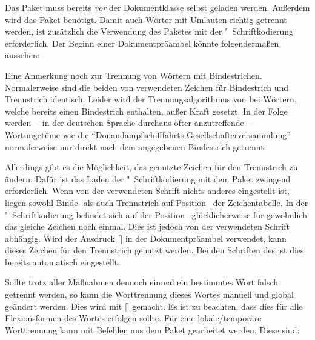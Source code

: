 Das Paket  muss bereits \emph{vor} der Dokumentklasse selbst 
geladen werden. Außerdem wird das Paket  benötigt. Damit auch 
Wörter mit Umlauten richtig getrennt werden, ist zusätzlich die Verwendung des 
Paketes  mit der "~Schriftkodierung erforderlich. 
Der Beginn einer Dokumentpräambel könnte folgendermaßen aussehen:
%
\begin{quoting}[rightmargin=0pt]
\end{quoting}
%
Eine Anmerkung noch zur Trennung von Wörtern mit Bindestrichen. Normalerweise 
sind die beiden von  verwendeten Zeichen für Bindestrich und 
Trennstrich identisch. Leider wird der Trennungsalgorithmus von  
bei Wörtern, welche bereits einen Bindestrich enthalten, außer Kraft gesetzt. 
In der Folge werden~-- in der deutschen Sprache durchaus öfter anzutreffende~-- 
Wortungetüme wie die \enquote{Donaudampfschifffahrts-Gesellschafterversammlung} 
normalerweise nur direkt nach dem angegebenen Bindestrich getrennt. 

Allerdings gibt es die Möglichkeit, das genutzte Zeichen für den Trennstrich 
zu ändern. Dafür ist das Laden der "~Schriftkodierung mit dem Paket 
 zwingend erforderlich. Wenn von der verwendeten Schrift 
nichts anderes eingestellt ist, liegen sowohl Binde- als auch Trennstrich auf 
Position~ der Zeichentabelle. In der "~Schriftkodierung 
befindet sich auf der Position~ glücklicherweise für gewöhnlich das 
gleiche Zeichen noch einmal. Dies ist jedoch von der verwendeten Schrift 
abhängig. Wird der Ausdruck [] in der 
Dokumentpräambel verwendet, kann dieses Zeichen für den Trennstrich genutzt 
werden. Bei den Schriften des \TUDCDs ist dies bereits automatisch eingestellt.

Sollte trotz aller Maßnahmen dennoch einmal ein bestimmtes Wort falsch getrennt 
werden, so kann die Worttrennung dieses Wortes manuell und global geändert 
werden. Dies wird mit [] 
gemacht. Es ist zu beachten, dass dies für alle Flexionsformen des Wortes 
erfolgen sollte. Für eine lokale/temporäre Worttrennung kann mit Befehlen aus 
dem Paket  gearbeitet werden. Diese sind: 

